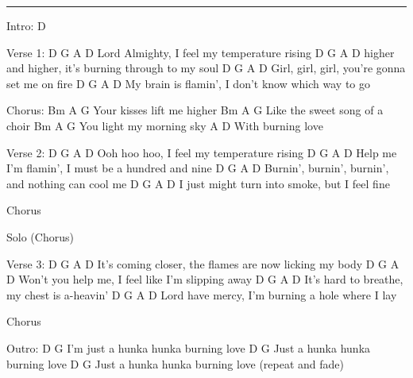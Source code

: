 \noindent\rule{\columnwidth}{1pt}

\begin{lstsong}
Intro: D
 
Verse 1:
D                G       A           D
Lord Almighty, I feel my temperature rising
D                  G            A             D
higher and higher, it's burning through to my soul
D                 G            A         D
Girl, girl, girl, you're gonna set me on fire
D                    G            A            D
My brain is flamin', I don't know which way to go
 
Chorus:
     Bm      A      G
Your kisses lift me higher
         Bm         A    G
Like the sweet song of a choir
    Bm       A       G
You light my morning sky
     A       D
With burning love
 
Verse 2:
D            G         A           D
Ooh hoo hoo, I feel my temperature rising
D                      G         A           D
Help me I'm flamin', I must be a hundred and nine
D                 G            A           D
Burnin', burnin', burnin', and nothing can cool me
D                      G          A      D
I just might turn into smoke, but I feel fine
 
Chorus
 
Solo (Chorus)
 
Verse 3:
D                       G              A          D
It's coming closer, the flames are now licking my body
D                    G             A         D
Won't you help me, I feel like I'm slipping away
D                        G        A       D
It's hard to breathe, my chest is a-heavin'
D                    G         A            D
Lord have mercy, I'm burning a hole where I lay
 
Chorus
 
Outro:
           D                   G
I'm just a hunka hunka burning love
        D                   G
Just a hunka hunka burning love
        D                   G
Just a hunka hunka burning love
(repeat and fade)
\end{lstsong}
\newpage
